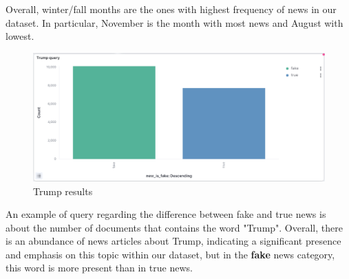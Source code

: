 Overall, winter/fall months are the ones with highest frequency of news in our dataset. In particular, November is the month with most news and August with lowest. 

\newpage

\begin{figure}[h!]
  \centering
  \includegraphics[width=1.0\linewidth]{Images/kibana_5.png}
  \caption{Trump results}
  \label{fig:kibana_4}
\end{figure}

An example of query regarding the difference between fake and true news is about the number of documents that contains the word "Trump".
Overall, there is an abundance of news articles about Trump, indicating a significant presence and emphasis on this topic within our dataset, but in the \textbf{fake} news category, this word is more present than in true news.



\newpage
















